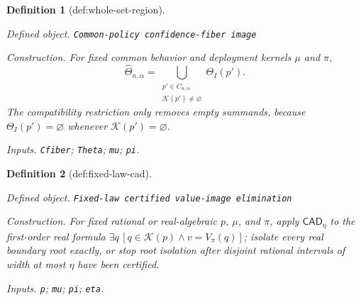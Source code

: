 \documentclass{article}
\newtheorem{definition}{Definition}
\begin{document}
\begin{definition}[def:whole-set-region]\label{def:whole-set-region}
\par\smallskip\noindent\emph{Defined object.} \texttt{Common-\allowbreak{}policy confidence-\allowbreak{}fiber image}
\par\smallskip\noindent\emph{Construction.} For fixed common behavior and deployment kernels \(\mu\) and \(\pi\),
\[
\widehat\Theta_{n,\alpha}
=\bigcup_{\substack{p'\in C_{n,\alpha}\\ \mathcal K(p')\ne\varnothing}}
\Theta_I(p').
\]
The compatibility restriction only removes empty summands, because \(\Theta_I(p')=\varnothing\) whenever \(\mathcal K(p')=\varnothing\).
\par\smallskip\noindent\emph{Inputs.} \texttt{Cfiber}; \texttt{Theta}; \texttt{mu}; \texttt{pi}.
\end{definition}

\begin{definition}[def:fixed-law-cad]\label{def:fixed-law-cad}
\par\smallskip\noindent\emph{Defined object.} \texttt{Fixed-\allowbreak{}law certified value-\allowbreak{}image elimination}
\par\smallskip\noindent\emph{Construction.} For fixed rational or real-algebraic \(p\), \(\mu\), and \(\pi\), apply \(\mathsf{CAD}_\eta\) to the first-order real formula \(\exists q\,[q\in\mathcal K(p)\wedge v=V_\pi(q)]\); isolate every real boundary root exactly, or stop root isolation after disjoint rational intervals of width at most \(\eta\) have been certified.
\par\smallskip\noindent\emph{Inputs.} \texttt{p}; \texttt{mu}; \texttt{pi}; \texttt{eta}.
\end{definition}
\end{document}

